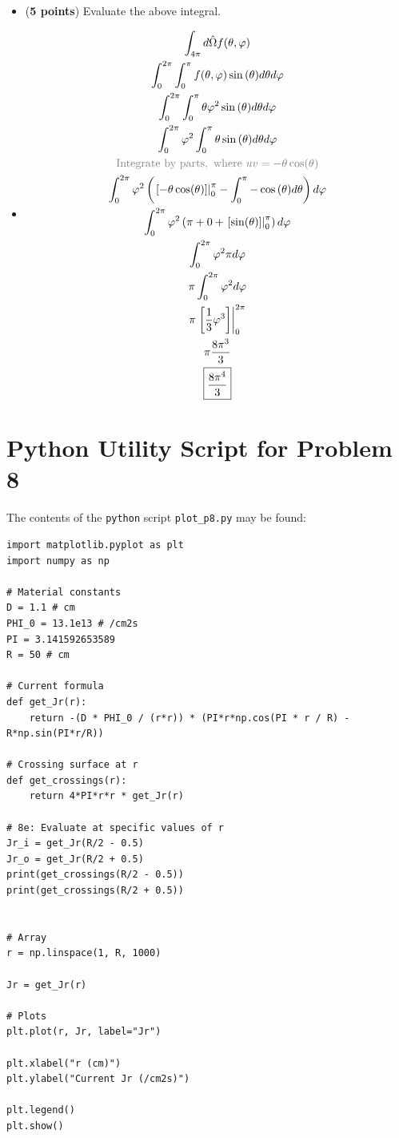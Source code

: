 \documentclass[11pt]{article}
\newcommand{\ans}[1]{{\color{violet}#1}}
\begin{document}
\begin{itemize}
\item[(a)] ({\bf 5 points}) Evaluate the above integral.
\item[] \ans{
\begin{equation*}
\begin{gathered}
    \int_{4\pi}d\hat{\Omega}f(\theta,\varphi) \\
    \int_{0}^{2\pi}\int_{0}^{\pi}f(\theta,\varphi)\sin{(\theta)}d\theta d\varphi \\
    \int_{0}^{2\pi}\int_{0}^{\pi}\theta\varphi^2\sin{(\theta)}d\theta d\varphi \\
    \int_{0}^{2\pi}\varphi^2\int_{0}^{\pi}\theta\sin{(\theta)}d\theta d\varphi \\
    \color{gray}\mathrm{Integrate\ by\ parts,\ where\ }uv=-\theta\cos(\theta) \\
    \int_{0}^{2\pi}\varphi^2
    \left(\left.\left[-\theta\cos(\theta)\right]\right|_0^\pi - 
    \int_{0}^{\pi}-\cos{(\theta)}d\theta\right)
    d\varphi\\
    \int_{0}^{2\pi}\varphi^2
    \left(\pi + 0 + \left.[\sin(\theta)]\right|_0^\pi\right)
    d\varphi\\
    \int_{0}^{2\pi}\varphi^2\pi d\varphi\\
    \pi\int_{0}^{2\pi}\varphi^2 d\varphi\\
    \pi\left.\left[\frac{1}{3}\varphi^3\right]\right|_0^{2\pi}\\
    \pi\frac{8\pi^3}{3}\\
    \boxed{\frac{8\pi^4}{3}}
\end{gathered}
\end{equation*}
}
\end{itemize}

\appendix
\section{Python Utility Script for Problem 8}\label{sec:p8e-script}
\ans{
The contents of the \texttt{python} script \texttt{plot\_p8.py} may be found:}
\begin{verbatim}
import matplotlib.pyplot as plt
import numpy as np

# Material constants
D = 1.1 # cm
PHI_0 = 13.1e13 # /cm2s
PI = 3.141592653589
R = 50 # cm

# Current formula
def get_Jr(r):
    return -(D * PHI_0 / (r*r)) * (PI*r*np.cos(PI * r / R) - R*np.sin(PI*r/R))

# Crossing surface at r
def get_crossings(r):
    return 4*PI*r*r * get_Jr(r)

# 8e: Evaluate at specific values of r
Jr_i = get_Jr(R/2 - 0.5)
Jr_o = get_Jr(R/2 + 0.5)
print(get_crossings(R/2 - 0.5))
print(get_crossings(R/2 + 0.5))


# Array
r = np.linspace(1, R, 1000)

Jr = get_Jr(r)

# Plots
plt.plot(r, Jr, label="Jr")

plt.xlabel("r (cm)")
plt.ylabel("Current Jr (/cm2s)")

plt.legend()
plt.show()


\end{verbatim}
\end{document}
